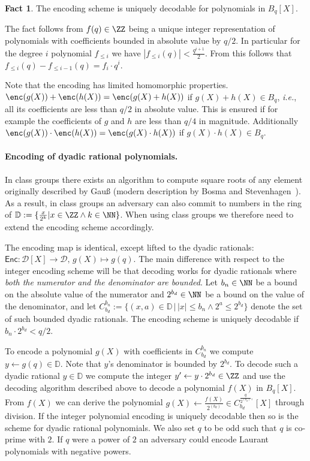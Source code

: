 \documentclass{article}
\theoremstyle{definition}
\newtheorem{fact}{Fact}
\begin{document}
\begin{fact}
	The encoding scheme is uniquely decodable for polynomials in $B_{q}[X]$.
\end{fact}
The fact follows from $f(q)\in \ZZ$ being a unique integer representation of polynomials with coefficients bounded in absolute value by $q/2$. In particular for the degree $i$ polynomial $f_{\leq i}$ we have $|f_{\leq i}(q)|<\frac{q^{i+1}}{2}$. From this follows that $f_{\leq i}(q)-f_{\leq i-1}(q)=f_i \cdot q^i$.  

Note that the encoding has limited homomorphic properties. $\enc(g(X))+\enc(h(X))=\enc(g(X)+h(X))$ if $g(X)+h(X)\in B_{q}$, \emph{i.e.}, all its coefficients are less than $q/2$ in absolute value. This is ensured if for example the coefficients of $g$ and $h$ are less than $q/4$ in magnitude. Additionally $\enc(g(X))\cdot \enc(h(X))=\enc(g(X)\cdot h(X))$ if $g(X)\cdot h(X)\in B_{q}$.

\paragraph{Encoding of dyadic rational polynomials.}
In class groups there exists an algorithm to compute square roots of any element originally described by Gauß (modern description by Bosma and Stevenhagen~\cite{bosma1996computation}). As a result, in class groups an adversary can also commit to numbers in the ring of  $\mathbb{D}:=\{\frac{x}{2^k} |x \in \ZZ \wedge k \in \NN\}$. When using class groups we therefore need to extend the encoding scheme accordingly. 

The encoding map is identical, except lifted to the dyadic rationals: $\mathsf{Enc} : \mathcal{D}[X] \rightarrow \mathcal{D}, \, g(X) \mapsto g(q)$. The main difference with respect to the integer encoding scheme will be that decoding works for dyadic rationals where \emph{both the numerator and the denominator are bounded}. Let $b_n \in \NN$ be a bound on the absolute value of the numerator and $2^{b_d}\in \NN$ be a bound on the value of the denominator, and let $C_{b_d}^{b_n}:=\{(x,a) \in \mathbb{D} \, | \, |x|\leq b_n \wedge 2^a\leq 2^{b_d}\}$ denote the set of such bounded dyadic rationals. The encoding scheme is uniquely decodable if $b_n\cdot 2^{b_d}<q/2$.
 
To encode a polynomial $g(X)$ with coefficients in $C_{b_d}^{b_n}$ we compute $y \gets g(q)\in \mathbb{D}$. Note that $y$'s denominator is bounded by $2^{b_d}$. To decode such a dyadic rational $y\in \mathbb{D}$ we compute the integer $y'\gets y\cdot 2^{b_d}\in \ZZ$  and use the decoding algorithm described above to decode a polynomial $f(X)$ in $B_{q}[X]$. From $f(X)$ we can derive the polynomial  $g(X)\gets \frac{f(X)}{2^{(b_d)}} \in C^{\frac{q}{2^{(b_d)}},}_{b_d}[X]$ through division. If the integer polynomial encoding is uniquely decodable then so is the scheme for dyadic rational polynomials.
We also set $q$ to be odd such that $q$ is co-prime with $2$. If $q$ were a power of $2$ an adversary could encode Laurant polynomials with negative powers.
\end{document}
